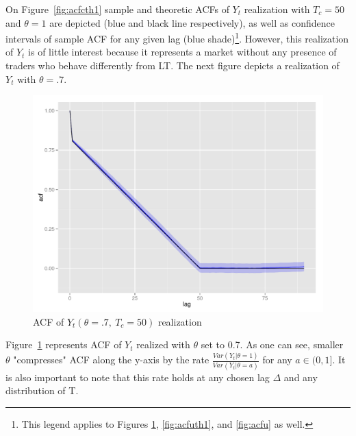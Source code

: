\documentclass[12pt]{article}
\begin{document}
On Figure~\ref{fig:acfcth1} sample and theoretic ACFs of $Y_t$ realization with $T_c=50$ and $\theta=1$ are depicted (blue and black line respectively), as well as confidence intervals of sample ACF for any given lag (blue shade)\footnote{This legend applies to Figures \ref{fig:acfc}, \ref{fig:acfuth1}, and \ref{fig:acfu} as well.}. However, this realization of $Y_t$ is of little interest because it represents a market without any presence of traders who behave differently from LT. The next figure depicts a realization of $Y_t$ with $\theta=.7$.
\begin{figure}[h]
  \centering
    \includegraphics[width=\textwidth]{acfc}
   \caption{ACF of $Y_t(\theta =.7,\ T_c=50)$ realization}
   \label{fig:acfc} 
\end{figure}
Figure~\ref{fig:acfc} represents ACF of $Y_t$ realized with $\theta$ set to 0.7. As one can see, smaller $\theta$ "compresses" ACF along the y-axis by the rate $\frac{Var(Y_t|\theta=1)}{Var(Y_t|\theta=a)}$ for any $a \in (0,1]$. It is also important to note that this rate holds at any chosen lag $\Delta$ and any distribution of T.
\newpage
\end{document}
